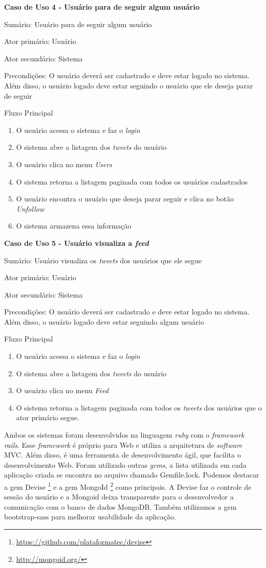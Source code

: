 \textbf{Caso de Uso 4 - Usuário para de seguir algum usuário}

Sumário: Usuário para de seguir algum usuário

Ator primário: Usuário

Ator secundário: Sistema

Precondições: O usuário deverá ser cadastrado e deve estar logado no sistema. Além disso, o usuário logado deve estar seguindo o usuário que ele deseja parar de seguir

Fluxo Principal
\begin{enumerate}
\item O usuário acessa o sistema e faz o \textit{login}
\item O sistema abre a listagem dos \textit{tweets} do usuário
\item O usuário clica no menu \textit{Users}
\item O sistema retorna a listagem paginada com todos os usuários cadastrados
\item O usuário encontra o usuário que deseja parar seguir e clica no botão \textit{Unfollow}
\item O sistema armazena essa informação
\end{enumerate}

\textbf{Caso de Uso 5 - Usuário visualiza a \textit{feed}}

Sumário: Usuário visualiza os \textit{tweets} dos usuários que ele segue

Ator primário: Usuário

Ator secundário: Sistema

Precondições: O usuário deverá ser cadastrado e deve estar logado no sistema. Além disso, o usuário logado deve estar seguindo algum usuário

Fluxo Principal
\begin{enumerate}
\item O usuário acessa o sistema e faz o \textit{login}
\item O sistema abre a listagem dos \textit{tweets} do usuário
\item O usuário clica no menu \textit{Feed}
\item O sistema retorna a listagem paginada com todos os \textit{tweets} dos usuários que o ator primário segue.
\end{enumerate}

Ambos os sistemas foram desenvolvidos na linguagem \textit{ruby} com o \textit{framework rails}. Esse \textit{framework} é próprio para Web e utiliza a arquitetura de \textit{software} \ac{MVC}. Além disso, é uma ferramenta de desenvolvimento ágil, que facilita o desenvolvimento Web.
Foram utilizado outras \textit{gems}, a lista utilizada em cada aplicação criada se encontra no arquivo chamado Gemfile.lock. Podemos destacar a gem Devise \footnote{\url{https://github.com/plataformatec/devise}} e a gem MongoId \footnote{\url{http://mongoid.org/}} como principais. A Devise faz o controle de sessão do usuário e a Mongoid deixa transparente para o desenvolvedor a comunicação com o banco de dados MongoDB. Também utilizamos a gem bootstrap-sass para melhorar usabilidade da aplicação.

